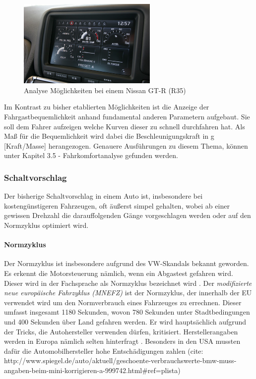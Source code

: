 \begin{figure}[!htb]\centering
	\includegraphics[width=0.6\textwidth]{images/gtrMultifunc}
	\caption{Analyse Möglichkeiten bei einem Nissan GT-R (R35) \cite{SIMR.CH1-Fahrstil-Analyse.GTRMultifunc}}\label{Fig:imgGTR}
\end{figure}

Im Kontrast zu bisher etablierten Möglichkeiten ist die Anzeige der Fahrgastbequemlichkeit anhand fundamental anderen Parametern aufgebaut. Sie soll dem Fahrer aufzeigen welche Kurven dieser zu schnell durchfahren hat. Als Maß für die Bequemlichkeit wird dabei die Beschleunigungskraft in g [Kraft/Masse] herangezogen. Genauere Ausführungen zu diesem Thema, können unter Kapitel 3.5 - Fahrkomfortanalyse gefunden werden.

\subsubsection{Schaltvorschlag}
Der bisherige Schaltvorschlag in einem Auto ist, insbesondere bei kostengünstigeren Fahrzeugen, oft äußerst simpel gehalten, wobei ab einer gewissen Drehzahl die darauffolgenden Gänge vorgeschlagen werden oder auf den Normzyklus optimiert wird. \cite{SIMR.CH1-Fahrstil-Analyse.Schaltempfehlung} 
\paragraph{Normzyklus}
Der Normzyklus ist insbesondere aufgrund des VW-Skandals bekannt geworden. Es erkennt die Motorsteuerung nämlich, wenn ein Abgastest gefahren wird. Dieser wird in der Fachsprache als Normzyklus bezeichnet wird \cite{SIMR.CH1-fahrstil-analyse.Normzyklus}. Der \textit{modifizierte neue europäische Fahrzyklus (MNEFZ)} ist der Normzyklus, der innerhalb der EU verwendet wird um den Normverbrauch eines Fahrzeuges zu errechnen. Dieser umfasst insgesamt 1180 Sekunden, wovon 780 Sekunden unter Stadtbedingungen und 400 Sekunden über Land gefahren werden. Er wird hauptsächlich aufgrund der Tricks, die Autohersteller verwenden dürfen, kritisiert. Herstellerangaben werden in Europa nämlich selten hinterfragt \cite{SIMR.CH1-fahrstil-analyse.MNEFZ}. Besonders in den USA mussten dafür die Automobilhersteller hohe Entschädigungen zahlen (cite: http://www.spiegel.de/auto/aktuell/geschoente-verbrauchswerte-bmw-muss-angaben-beim-mini-korrigieren-a-999742.html#ref=plista)
